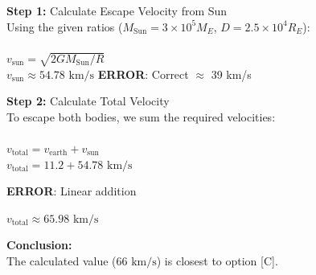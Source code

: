 \begin{minipage}{\linewidth}
\begin{tcolorbox}[
    title={\small\textbf{JEE Advanced 2017 Paper 2}},
    colback=white,
    colframe=gray!50!black,
    arc=3pt,
    boxrule=1pt,
    fonttitle=\sffamily\large,
    width=\linewidth
]
    \noindent
    \begin{minipage}[t]{0.49\linewidth}
        \vspace{0pt} 
        \begin{tcolorbox}[
            title={\scriptsize \textbf{BASE MODEL}},
            colframe=blue!60!white,
            colback=blue!5!white,
            coltitle=white,
            fontupper=\scriptsize\ttfamily\raggedright,
            boxrule=0.5pt,
            sharp corners,
            left=2pt, right=2pt,
            width=\linewidth,
            nobeforeafter
        ]
            \textbf{\textcolor{blue!60!black}{Step 1:}} Calculate Escape Velocity from Sun\\
            Using the given ratios ($M_{\text{Sun}} = 3\times 10^5 M_E$, $D = 2.5\times 10^4 R_E$):\\\hfill\\
            $v_{\text{sun}} = \sqrt{2 G M_{\text{Sun}} / R}$\\
            $v_{\text{sun}} \approx 54.78\text{ km/s}$
            \colorbox{red!15}{\textcolor{red!80!black}{\textbf{ERROR}: }}
            \colorbox{red!15}{\textcolor{red!80!black}{Correct $\approx$ 39 km/s}}
            \vspace{0.3em}
            
            \vspace{1em}
            
            \textbf{\textcolor{blue!60!black}{Step 2:}} Calculate Total Velocity\\
            To escape both bodies, we sum the required velocities:\\\hfill\\
            $v_{\text{total}} = v_{\text{earth}} + v_{\text{sun}}$\\
            $v_{\text{total}} = 11.2 + 54.78\text{ km/s}$
            
            \vspace{0.3em}
            \colorbox{red!15}{\textcolor{red!80!black}{\textbf{ERROR}: }}
            \colorbox{red!15}{\textcolor{red!80!black}{Linear addition}}
            \vspace{0.3em}
            
            $v_{\text{total}} \approx 65.98\text{ km/s}$
            \vspace{1em}
            
            \textbf{Conclusion:}\\
            The calculated value ($66\text{ km/s}$) is closest to option [C].
            \vspace{1em}
            

\end{tcolorbox}
\end{minipage}
\end{tcolorbox}
\end{minipage}
